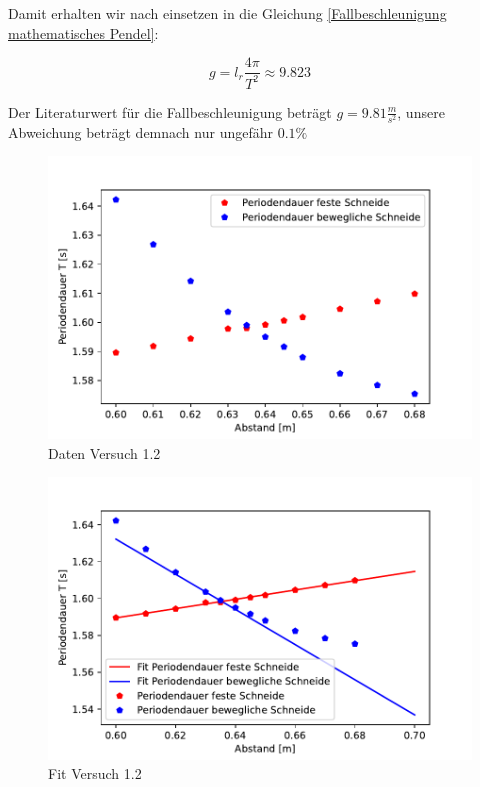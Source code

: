 Damit erhalten wir nach einsetzen in die Gleichung \ref{Fallbeschleunigung mathematisches Pendel}:

$$ g = l_r \frac{4 \pi}{T^2} \approx 9.823 $$

Der Literaturwert für die Fallbeschleunigung beträgt $g=9.81 \frac{m}{s^2}$, unsere Abweichung beträgt demnach nur ungefähr $0.1 \% $

\begin{figure}[ht]
    \centering
    \includegraphics[scale=0.8]{Pendel/Protokoll/fig/Pendel Versuch 1.2.pdf}
    \caption{Daten Versuch 1.2}
    \label{fig:Pendel Versuch 1.1}
\end{figure}

\begin{figure}[ht]
    \centering
    \includegraphics[scale=0.8]{Pendel/Protokoll/fig/Pendel Versuch 1.2 Fit.pdf}
    \caption{Fit Versuch 1.2}
    \label{fig:Pendel Versuch 1.1 Fit}
\end{figure}